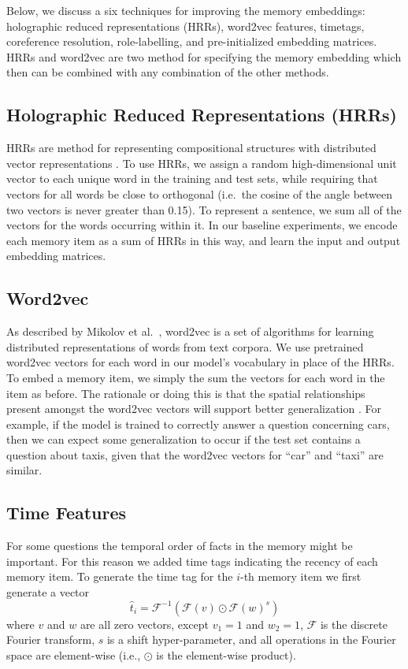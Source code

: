 \documentclass[10pt]{article}
\begin{document}
Below, we discuss a six techniques for improving the memory embeddings: 
holographic reduced representations (HRRs), word2vec features, timetags, 
coreference resolution, role-labelling, and pre-initialized embedding 
matrices.  HRRs and word2vec are two method for specifying the memory embedding 
which then can be combined with any combination of the other methods. 

\subsection{Holographic Reduced Representations (HRRs)}
HRRs are method for representing compositional structures with distributed vector representations \cite{Plate:2003}. To use HRRs, we assign a random high-dimensional unit vector to each unique word in the training and test sets, while requiring that vectors for all words be close to orthogonal (i.e.~the cosine of the angle between two vectors is never greater than 0.15). To represent a sentence, we sum all of the vectors for the words occurring within it. In our baseline experiments, we encode each memory item as a sum of HRRs in this way, and learn the input and output embedding matrices.

\subsection{Word2vec}
As described by Mikolov et al.~\cite{Mikolov:2013}, word2vec is a set of 
algorithms for learning distributed representations of words from text corpora.  
We use pretrained word2vec vectors for each word in our model's vocabulary in 
place of the HRRs. To embed a memory item, we simply the sum the vectors for 
each word in the item as before. The rationale or doing this is that the spatial 
relationships present amongst the word2vec vectors will support better 
generalization \cite{Darshan:2015}. For example, if the model is trained to 
correctly answer a question concerning cars, then we can expect some 
generalization to occur if the test set contains a question about taxis, given 
that the word2vec vectors for ``car'' and ``taxi'' are similar. 

\subsection{Time Features}
For some questions the temporal order of facts in the memory might be important.  
For this reason we added time tags indicating the recency of each memory item.  
To generate the time tag for the $i$-th memory item we first generate a vector
\begin{equation}
    \hat t_i = \mathcal{F}^{-1}(\mathcal{F}(v) \odot {\mathcal{F}(w)}^s)
\end{equation}
where $v$ and $w$ are all zero vectors, except $v_1 = 1$ and $w_2 = 1$, 
$\mathcal{F}$ is the discrete Fourier transform, $s$ is a shift hyper-parameter, 
and all operations in the Fourier space are element-wise (i.e., $\odot$ is 
the element-wise product).
\end{document}
